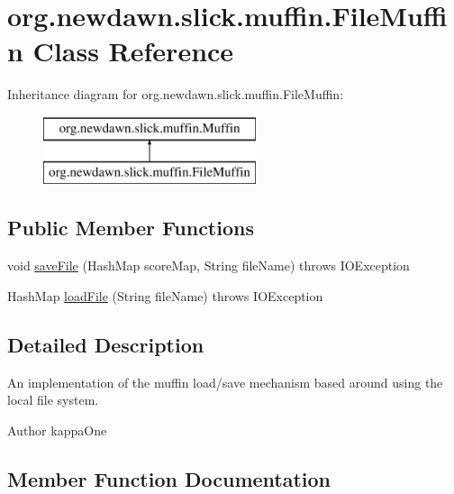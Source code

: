 \hypertarget{classorg_1_1newdawn_1_1slick_1_1muffin_1_1_file_muffin}{}\section{org.\+newdawn.\+slick.\+muffin.\+File\+Muffin Class Reference}
\label{classorg_1_1newdawn_1_1slick_1_1muffin_1_1_file_muffin}
Inheritance diagram for org.\+newdawn.\+slick.\+muffin.\+File\+Muffin\+:\begin{figure}[H]
\begin{center}
\leavevmode
\includegraphics[height=2.000000cm]{classorg_1_1newdawn_1_1slick_1_1muffin_1_1_file_muffin}
\end{center}
\end{figure}
\subsection*{Public Member Functions}
\begin{DoxyCompactItemize}
\item 
void \mbox{\hyperlink{classorg_1_1newdawn_1_1slick_1_1muffin_1_1_file_muffin_ade293cc9f254442a763d22c2b0988aad}{save\+File}} (Hash\+Map score\+Map, String file\+Name)  throws I\+O\+Exception 
\item 
Hash\+Map \mbox{\hyperlink{classorg_1_1newdawn_1_1slick_1_1muffin_1_1_file_muffin_a5db97db7631d95ba851f1d4d81ed3825}{load\+File}} (String file\+Name)  throws I\+O\+Exception 
\end{DoxyCompactItemize}


\subsection{Detailed Description}
An implementation of the muffin load/save mechanism based around using the local file system.

\begin{DoxyAuthor}{Author}
kappa\+One 
\end{DoxyAuthor}


\subsection{Member Function Documentation}
\mbox{\label{classorg_1_1newdawn_1_1slick_1_1muffin_1_1_file_muffin_a5db97db7631d95ba851f1d4d81ed3825}} 
